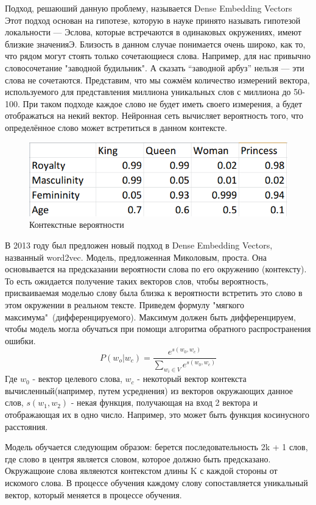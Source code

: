 Подход, решаюший данную проблему,  называется Dense Embedding Vectors
Этот подход основан на гипотезе, которую в науке принято называть гипотезой локальности — Эслова, которые встречаются в одинаковых окружениях, имеют близкие значенияЭ. Близость в данном случае понимается очень широко, как то, что рядом могут стоять только сочетающиеся слова. Например, для нас привычно словосочетание "заводной будильник". А сказать “заводной арбуз”  нельзя — эти слова не сочетаются.
Представим, что мы сожмём количество измерений вектора, используемого для представления миллиона уникальных слов с миллиона  до 50-100. При таком подходе каждое слово не будет иметь своего измерения, а будет отображаться на некий вектор.
Нейронная сеть вычисляет вероятность того, что определённое слово может встретиться в данном контексте.
\begin{figure}[!h]
	\centering
	\includegraphics[width=.5\textwidth]{master_img/dense_emb_example_edited.png}
	\caption{Контекстные вероятности}
	\label{fig06_master}
\end{figure}

В 2013 году был предложен новый подход в Dense Embedding Vectors, названный word2vec.
Модель, предложенная Миколовым\cite{Book28}, проста. Она основывается на  предсказании вероятности слова по его окружению (контексту). То есть ожидается получение таких векторов слов, чтобы вероятность, присваиваемая моделью слову была близка к вероятности встретить это слово в этом окружении в реальном тексте.
Приведем формулу "мягкого максимума"\ (дифференцируемого). Максимум должен быть дифференцируем, чтобы модель могла обучаться при помощи алгоритма обратного распространения ошибки.
\begin{equation}
P(w_o|w_c) = \frac{e^{s(w_0, w_c)}}{\sum_{w_i \in V}e^{s(w_0, w_c)}}
\end{equation}
Где $w_0$ - вектор целевого слова, $w_c$  - некоторый вектор контекста вычисленный(например, путем усреднения) из векторов окружающих данное  слов, $s(w_1, w_2)$  - некая функция, получающая на вход 2 вектора и отображающая их в одно число. Например, это может быть функция косинусного расстояния.

Модель обучается следующим образом: берется последовательность 2k + 1 слов, где слово в центря является словом, которое должно быть предсказано. Окружащюие слова являеются контекстом длины K с каждой стороны от искомого слова. В процессе обучения каждому слову сопоставляется уникальный вектор, который меняется в процессе обучения.

